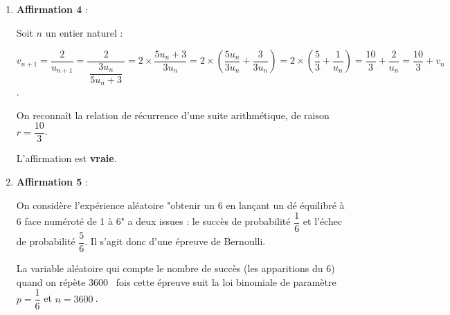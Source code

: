 \documentclass[10pt]{article}
\providecommand{\R}{\mathbb{R}}
\providecommand{\np}[2][]{{#2~#1}}
\begin{document}
\begin{enumerate}
		On peut résoudre l'inéquation sur l'intervalle $]7 ; +\infty[$, et on a :

		$\begin{aligned}[t] \forall x \in ]7 ;+\infty[, \quad
		\ln \left(2x^2 - 6x - 56\right) \geqslant \ln(4x - 8)
		& \iff 2x^2 - 6x - 56 \geqslant 4x - 8 \quad &\text{car la fonction ln est}\\
		&&\text{croissante sur }\R^{*+}\\
		& \iff 2x^2 - 10x - 48 \geqslant 0 \\
		& \iff x^2-5x-24 \geqslant 0&\text{car }2 >0
		\end{aligned}$

		Le discriminant est :\quad $\Delta = b^2-4ac = 121$,\quad donc la fonction du second degré \quad $x \longmapsto x^2-5x-24$ \quad admet deux racines :\quad $-3$ et 8.

		Le coefficient du terme de degré 2 est $a=1$, donc cette fonction est positive sur $]-\infty  ; -3] \cup [8 ;+\infty[$.

		Sur $]7  ; + \infty[$, l'inéquation a pour ensemble de solutions l'intervalle $[8 ; +\infty[$.

		L'affirmation est \textbf{vraie}.

		\item \textbf{Affirmation 4} :

		Soit $n$ un entier naturel :

		$v_{n+1} = \dfrac{2}{u_{n+1}} = \dfrac{2}{~\dfrac{3u_n}{5u_n+3}~} = 2\times \dfrac{5u_n + 3}{3u_n} = 2\times \left(\dfrac{5u_n}{3u_n} + \dfrac{3}{3u_n}\right) = 2\times \left(\dfrac{5}{3} + \dfrac{1}{u_n}\right) = \dfrac{10}{3} + \dfrac{2}{u_n} = \dfrac{10}{3} + v_n$.

		On reconnaît la relation de récurrence d'une suite arithmétique, de raison $r = \dfrac{10}{3}$.

		L'affirmation est \textbf{vraie}.

		\item \textbf{Affirmation 5} :

		On considère l'expérience aléatoire "obtenir un 6 en lançant un dé équilibré à 6 face numéroté de 1 à 6" a deux issues : le succès de probabilité $\dfrac16$ et l'échec de probabilité $\dfrac56$. Il s'agit donc d'une épreuve de Bernoulli.

		La variable aléatoire qui compte le nombre de succès (les apparitions du 6) quand on répète \np{3600} fois cette épreuve suit la loi binomiale de paramètre $p=\dfrac16$ et $n=\np{3600}$.


\end{enumerate}
\end{document}
